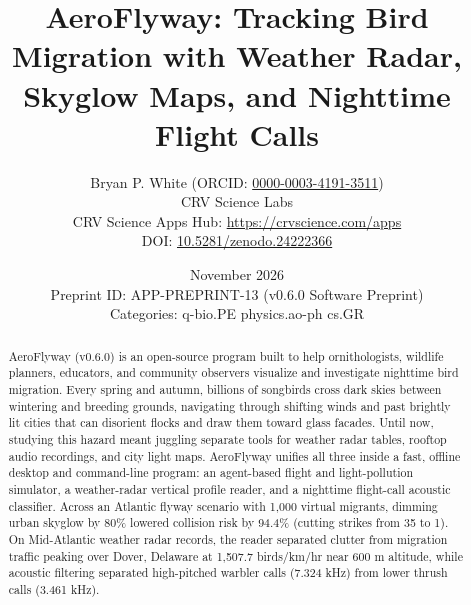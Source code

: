 \documentclass[10pt,letterpaper]{article}
\title{\textbf{AeroFlyway: Tracking Bird Migration with Weather Radar, Skyglow Maps, and Nighttime Flight Calls}}
\author{Bryan P. White (ORCID: \href{https://orcid.org/0000-0003-4191-3511}{0000-0003-4191-3511}) \\ CRV Science Labs \\ \small CRV Science Apps Hub: \url{https://crvscience.com/apps} \\ \small DOI: \href{https://doi.org/10.5281/zenodo.24222366}{10.5281/zenodo.24222366}}
\date{November 2026 \\ \small Preprint ID: APP-PREPRINT-13 (v0.6.0 Software Preprint) \\ \small Categories: q-bio.PE \textbullet{} physics.ao-ph \textbullet{} cs.GR}
\begin{document}
\maketitle

\begin{abstract}
AeroFlyway (v0.6.0) is an open-source program built to help ornithologists, wildlife planners, educators, and community observers visualize and investigate nighttime bird migration. Every spring and autumn, billions of songbirds cross dark skies between wintering and breeding grounds, navigating through shifting winds and past brightly lit cities that can disorient flocks and draw them toward glass facades. Until now, studying this hazard meant juggling separate tools for weather radar tables, rooftop audio recordings, and city light maps. AeroFlyway unifies all three inside a fast, offline desktop and command-line program: an agent-based flight and light-pollution simulator, a weather-radar vertical profile reader, and a nighttime flight-call acoustic classifier. Across an Atlantic flyway scenario with 1,000 virtual migrants, dimming urban skyglow by 80\% lowered collision risk by 94.4\% (cutting strikes from 35 to 1). On Mid-Atlantic weather radar records, the reader separated clutter from migration traffic peaking over Dover, Delaware at 1,507.7 birds/km/hr near 600 m altitude, while acoustic filtering separated high-pitched warbler calls (7.324 kHz) from lower thrush calls (3.461 kHz).
\end{abstract}
\end{document}
